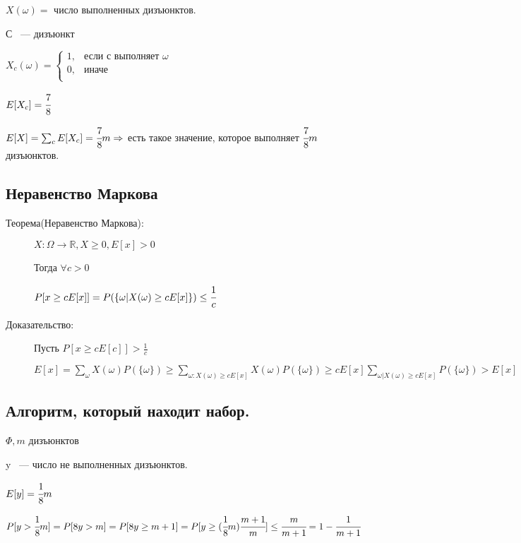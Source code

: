 \documentclass[12pt]{article}
\begin{document}
\begin{description}
\begin{description}
$X(\omega) =$ число выполненных дизъюнктов.  

С ~--- дизъюнкт

$X_c(\omega) = \begin{cases} 1, & \text{если с выполняет $\omega$} \\ 0, & \text{иначе} \\ \end{cases}$

$E[X_c] = \cfrac{7}{8}$

$E[X] = \sum_{c} E[X_c] = \cfrac{7}{8} m \Rightarrow$ есть такое значение, которое выполняет $\cfrac{7}{8} m$ дизъюнктов.
\end{description}

\subsection{Неравенство Маркова}

\begin{description}
\item[Теорема(Неравенство Маркова):]

$X: \Omega \to \mathbb R, X \ge 0, E[x] > 0$

Тогда $\forall c > 0$ 

$P[x \ge c E[x]] = P(\{\omega | X(\omega) \ge cE[x]\}) \le \cfrac{1}{c}$

\item[Доказательство:]

Пусть $P[x \ge c E[c]] > \frac{1}{c}$

$E[x] = \sum_{\omega} X(\omega)P(\{\omega\}) \ge \sum_{\omega: X(\omega) \ge c E[x]} X(\omega)P(\{\omega\}) \ge c E[x] \sum_{\omega| X(\omega) \ge c E[x]} P(\{ \omega\}) > E[x]$ 

\end{description}

\subsection{Алгоритм, который находит набор.}

\begin{description}

\item $\Phi, m$ дизъюнктов

y ~--- число не выполненных дизъюнктов.

$E[y] = \cfrac{1}{8} m$

$P[y > \cfrac{1}{8} m] = P[8y > m] = P[8y \ge m + 1] = P[y \ge (\cfrac{1}{8} m) \cfrac{m + 1}{m}] \le \cfrac{m}{m + 1} = 1 - \cfrac{1}{m + 1}$


\end{description}
\end{description}
\end{document}
